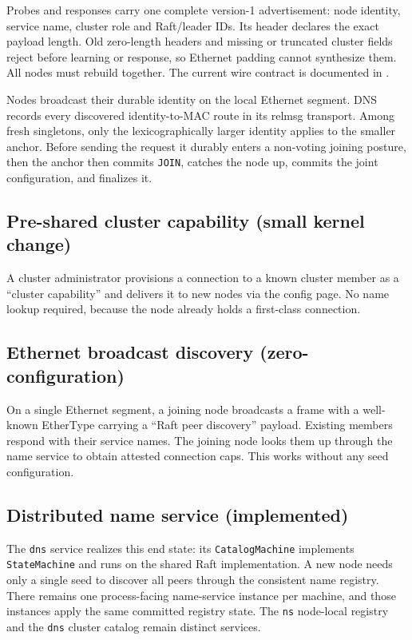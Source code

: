 Probes and responses carry one complete version-1 advertisement: node identity,
service name, cluster role and Raft/leader IDs. Its header declares the exact
payload length. Old zero-length headers and missing or truncated cluster
fields reject before learning or response, so Ethernet padding cannot synthesize
them. All nodes must rebuild together. The current wire contract is documented
in .

Nodes broadcast their durable identity on the local Ethernet segment. DNS
records every discovered identity-to-MAC route in its relmsg transport. Among
fresh singletons, only the lexicographically larger identity applies to the
smaller anchor. Before sending the request it durably enters a non-voting
joining posture, then the anchor then commits \texttt{JOIN}, catches the node up,
commits the joint configuration, and finalizes it.

\subsection{Pre-shared cluster capability (small kernel change)}

A cluster administrator provisions a connection to a known cluster member as a
``cluster capability'' and delivers it to new nodes via the config page.
No name lookup required, because the node already holds a first-class connection.

\subsection{Ethernet broadcast discovery (zero-configuration)}

On a single Ethernet segment, a joining node broadcasts a frame with a
well-known EtherType carrying a ``Raft peer discovery'' payload. Existing
members respond with their service names. The joining node looks them up
through the name service to obtain attested connection caps. This works
without any seed configuration.

\subsection{Distributed name service (implemented)}

The \texttt{dns} service realizes this end state: its \texttt{CatalogMachine}
implements \texttt{StateMachine} and runs on the shared Raft implementation. A new
node needs only a single seed to discover all peers through the consistent
name registry. There remains one process-facing name-service instance per
machine, and those instances apply the same committed registry state. The
\texttt{ns} node-local registry and the \texttt{dns} cluster catalog remain
distinct services.

